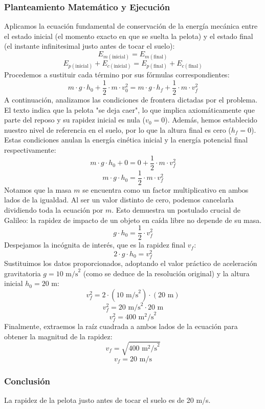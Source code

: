 \documentclass[12pt,a4paper]{article}
\begin{document}
\subsubsection*{Planteamiento Matemático y Ejecución}
Aplicamos la ecuación fundamental de conservación de la energía mecánica entre el estado inicial (el momento exacto en que se suelta la pelota) y el estado final (el instante infinitesimal justo antes de tocar el suelo):
$$E_{m(\text{inicial})} = E_{m(\text{final})}$$
$$E_{p(\text{inicial})} + E_{c(\text{inicial})} = E_{p(\text{final})} + E_{c(\text{final})}$$
Procedemos a sustituir cada término por sus fórmulas correspondientes:
$$m \cdot g \cdot h_0 + \frac{1}{2} \cdot m \cdot v_0^2 = m \cdot g \cdot h_f + \frac{1}{2} \cdot m \cdot v_f^2$$
A continuación, analizamos las condiciones de frontera dictadas por el problema. El texto indica que la pelota "se deja caer", lo que implica axiomáticamente que parte del reposo y su rapidez inicial es nula ($v_0 = 0$). Además, hemos establecido nuestro nivel de referencia en el suelo, por lo que la altura final es cero ($h_f = 0$). Estas condiciones anulan la energía cinética inicial y la energía potencial final respectivamente:
$$m \cdot g \cdot h_0 + 0 = 0 + \frac{1}{2} \cdot m \cdot v_f^2$$
$$m \cdot g \cdot h_0 = \frac{1}{2} \cdot m \cdot v_f^2$$
Notamos que la masa $m$ se encuentra como un factor multiplicativo en ambos lados de la igualdad. Al ser un valor distinto de cero, podemos cancelarla dividiendo toda la ecuación por $m$. Esto demuestra un postulado crucial de Galileo: la rapidez de impacto de un objeto en caída libre no depende de su masa.
$$g \cdot h_0 = \frac{1}{2} \cdot v_f^2$$
Despejamos la incógnita de interés, que es la rapidez final $v_f$:
$$2 \cdot g \cdot h_0 = v_f^2$$
Sustituimos los datos proporcionados, adoptando el valor práctico de aceleración gravitatoria $g = 10 \text{ m/s}^2$ (como se deduce de la resolución original) y la altura inicial $h_0 = 20 \text{ m}$:
$$v_f^2 = 2 \cdot (10 \text{ m/s}^2) \cdot (20 \text{ m})$$
$$v_f^2 = 20 \text{ m/s}^2 \cdot 20 \text{ m}$$
$$v_f^2 = 400 \text{ m}^2\text{/s}^2$$
Finalmente, extraemos la raíz cuadrada a ambos lados de la ecuación para obtener la magnitud de la rapidez:
$$v_f = \sqrt{400 \text{ m}^2\text{/s}^2}$$
$$v_f = 20 \text{ m/s}$$

\subsubsection*{Conclusión}
La rapidez de la pelota justo antes de tocar el suelo es de 20 m/s.
\end{document}

